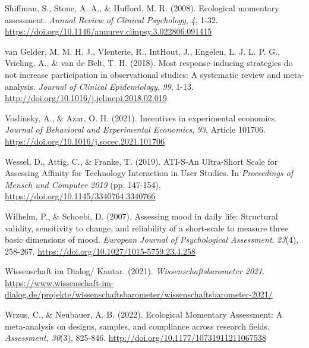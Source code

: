 \documentclass[authordate, empirical]{jote-new-article}
\begin{document}
	Shiffman, S., Stone, A. A., \& Hufford, M. R. (2008). Ecological momentary assessment. \emph{Annual Review of Clinical Psychology},\emph{ 4}, 1-32. \href{https://doi.org/10.1146/annurev.clinpsy.3.022806.091415}{https://doi.org/10.1146/annurev.clinpsy.3.022806.091415}



	van Gelder, M. M. H. J., Vlenterie, R., IntHout, J., Engelen, L. J. L. P. G., Vrieling, A., \& van de Belt, T. H. (2018). Most response-inducing strategies do not increase participation in observational studies: A systematic review and meta-analysis. \emph{Journal of Clinical Epidemiology},\emph{ 99}, 1-13. \href{http://doi.org/10.1016/j.jclinepi.2018.02.019}{http://doi.org/10.1016/j.jclinepi.2018.02.019}



	Voslinsky, A., \& Azar, O. H. (2021). Incentives in experimental economics. \emph{Journal of Behavioral and Experimental Economics},\emph{ 93}, Article 101706. \href{https://doi.org/10.1016/j.socec.2021.101706}{https://doi.org/10.1016/j.socec.2021.101706}



	Wessel, D., Attig, C., \& Franke, T. (2019). ATI-S-An Ultra-Short Scale for Assessing Affinity for Technology Interaction in User Studies. In \emph{Proceedings of Mensch und Computer 2019} (pp. 147-154). \href{https://doi.org/10.1145/3340764.3340766}{https://doi.org/10.1145/3340764.3340766}



	Wilhelm, P., \& Schoebi, D. (2007). Assessing mood in daily life: Structural validity, sensitivity to change, and reliability of a short-scale to measure three basic dimensions of mood. \emph{European Journal of Psychological Assessment},\emph{ 23}(4), 258-267. \href{https://doi.org/10.1027/1015-5759.23.4.258}{https://doi.org/10.1027/1015-5759.23.4.258}



	Wissenschaft im Dialog/ Kantar. (2021). \emph{Wissenschaftsbarometer 2021}. \href{https://www.wissenschaft-im-dialog.de/projekte/wissenschaftsbarometer/wissenschaftsbarometer-2021/}{https://www.wissenschaft-im-dialog.de/projekte/wissenschaftsbarometer/wissenschaftsbarometer-2021/}



	Wrzus, C., \& Neubauer, A. B. (2022). Ecological Momentary Assessment: A meta-analysis on designs, samples, and compliance across research fields. \emph{Assessment, 30}(3), 825-846. \href{http://doi.org/10.1177/10731911211067538}{http://doi.org/10.1177/10731911211067538}
\end{document}
